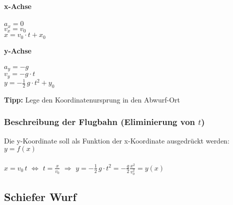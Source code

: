 	\begin{minipage}{0.45\linewidth}
	\textbf{x-Achse} \\
	\\
	$a_x = 0$ \\
	$v_x = v_0$ \\
	$x = v_0 \cdot t + x_0$ \\
	\end{minipage}	
	\hfill	
	\begin{minipage}{0.45\linewidth}
	\textbf{y-Achse} \\
	\\
	$a_y = -g$ \\
	$v_y = -g \cdot t$ \\
	$y = - \frac{1}{2} \, g \cdot t^2 + y_0$ \\
	\end{minipage}	
	
	\textbf{Tipp:} Lege den Koordinatenursprung in den Abwurf-Ort
		
		
		
	\subsubsection{Beschreibung der Flugbahn (Eliminierung von $t$)}	
	Die y-Koordinate soll als Funktion der x-Koordinate ausgedrückt werden: $y = f(x)$ \\
	\\
	$x = v_0 \, t$ \quad $\Leftrightarrow$ \quad $t = \frac{x}{v_0}$ \quad $\Rightarrow$ \quad $y = - \frac{1}{2} \, g \cdot t^2 = - \frac{g}{2} \frac{x^2}{v_0^2} = y(x)$
		
		
		
		
	\subsection{Schiefer Wurf}
	
